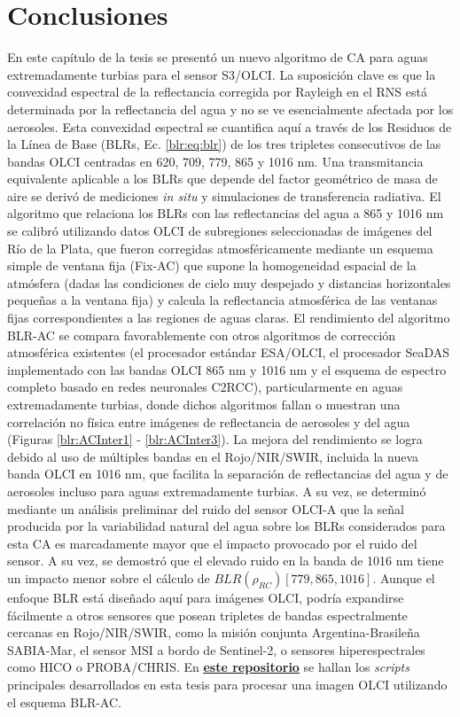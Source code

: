 \section{Conclusiones}
\label{blr:s:conclusion}

    En este capítulo de la tesis se presentó un nuevo algoritmo de CA para aguas extremadamente turbias para el sensor S3/OLCI. La suposición clave es que la convexidad espectral de la reflectancia corregida por Rayleigh en el RNS está determinada por la reflectancia del agua y no se ve esencialmente afectada por los aerosoles. Esta convexidad espectral se cuantifica aquí a través de los Residuos de la Línea de Base (BLRs, Ec. \ref{blr:eq:blr}) de los tres tripletes consecutivos de las bandas OLCI centradas en 620, 709, 779, 865 y 1016 nm. Una transmitancia equivalente aplicable a los BLRs que depende del factor geométrico de masa de aire se derivó de mediciones \textit{in situ} y simulaciones de transferencia radiativa. El algoritmo que relaciona los BLRs con las reflectancias del agua a 865 y 1016 nm se calibró utilizando datos OLCI de subregiones seleccionadas de imágenes del Río de la Plata, que fueron corregidas atmosféricamente mediante un esquema simple de ventana fija (Fix-AC) que supone la homogeneidad espacial de la atmósfera (dadas las condiciones de cielo muy despejado y distancias horizontales pequeñas a la ventana fija) y calcula la reflectancia atmosférica de las ventanas fijas correspondientes a las regiones de aguas claras. El rendimiento del algoritmo BLR-AC se compara favorablemente con otros algoritmos de corrección atmosférica existentes (el procesador estándar ESA/OLCI, el procesador SeaDAS implementado con las bandas OLCI 865 nm y 1016 nm y el esquema de espectro completo basado en redes neuronales C2RCC), particularmente en aguas extremadamente turbias, donde dichos algoritmos fallan o muestran una correlación no física entre imágenes de reflectancia de aerosoles y del agua (Figuras \ref{blr:ACInter1} - \ref{blr:ACInter3}). La mejora del rendimiento se logra debido al uso de múltiples bandas en el Rojo/NIR/SWIR, incluida la nueva banda OLCI en 1016 nm, que facilita la separación de reflectancias del agua y de aerosoles incluso para aguas extremadamente turbias. A su vez, se determinó mediante un análisis preliminar del ruido del sensor OLCI-A que la señal producida por la variabilidad natural del agua sobre los BLRs considerados para esta CA es marcadamente mayor que el impacto provocado por el ruido del sensor. A su vez, se demostró que el elevado ruido en la banda de 1016 nm tiene un impacto menor sobre el cálculo de $BLR(\rho_{RC})[779,865,1016]$.
    Aunque el enfoque BLR está diseñado aquí para imágenes OLCI, podría expandirse fácilmente a otros sensores que posean tripletes de bandas espectralmente cercanas en Rojo/NIR/SWIR, como la misión conjunta Argentina-Brasileña SABIA-Mar, el sensor MSI a bordo de Sentinel-2, o sensores hiperespectrales como HICO o PROBA/CHRIS. En \href{https://github.com/juanchossn/scripts_tesis_doctoral}{\textbf{\underline{este repositorio}}}\cite{repo} se hallan los \textit{scripts} principales desarrollados en esta tesis para procesar una imagen OLCI utilizando el esquema BLR-AC.